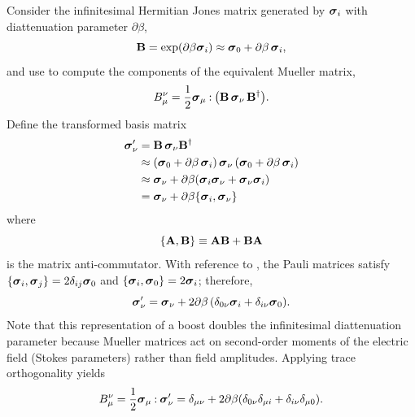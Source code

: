 Consider the infinitesimal Hermitian Jones matrix generated by $\mbox{\boldmath $\sigma$}_{i}$ with 
diattenuation parameter $\partial\beta$,
\begin{equation}
\label{eqn:small_boost_basis_Jones}
{\bf B} = \exp(\partial\beta\mbox{\boldmath $\sigma$}_{i}) \approx \mbox{\boldmath $\sigma$}_{0} + \partial\beta \, \mbox{\boldmath $\sigma$}_{i},
\end{equation} 
and use  to compute the components of the equivalent Mueller matrix,
\begin{equation}
  B_\mu^\nu = \frac{1}{2} {\mbox{\boldmath $\sigma$}_{\mu}}\mathbin{:}{\left({\bf B} \, \mbox{\boldmath $\sigma$}_{\nu}\,{\bf B}^\dagger\right)}.
\end{equation}
%
Define the transformed basis matrix
\begin{equation}
\begin{split}
\mbox{\boldmath $\sigma$}_{\nu}' & = {\bf B} \, \mbox{\boldmath $\sigma$}_{\nu} {\bf B} ^\dagger \\
  & \approx \left( \mbox{\boldmath $\sigma$}_{0} + \partial\beta \, \mbox{\boldmath $\sigma$}_{i} \right) \mbox{\boldmath $\sigma$}_{\nu} \left( \mbox{\boldmath $\sigma$}_{0} + \partial\beta \, \mbox{\boldmath $\sigma$}_{i} \right) \\
  & \approx \mbox{\boldmath $\sigma$}_{\nu} + \partial\beta (\mbox{\boldmath $\sigma$}_{i} \mbox{\boldmath $\sigma$}_{\nu} + \mbox{\boldmath $\sigma$}_{\nu} \mbox{\boldmath $\sigma$}_{i}) \\
  & = \mbox{\boldmath $\sigma$}_{\nu} + \partial\beta \{\mbox{\boldmath $\sigma$}_{i}, \mbox{\boldmath $\sigma$}_{\nu}\}
\end{split}
\end{equation}
%
where 
\begin{equation} \label{eqn:anticommutator}
    \{{\bf A}, {\bf B}\} \equiv {\bf AB} + {\bf BA}
\end{equation} 
is the matrix anti-commutator.
%
With reference to , the Pauli matrices satisfy 
$\{\mbox{\boldmath $\sigma$}_{i}, \mbox{\boldmath $\sigma$}_{j}\} = 2\delta_{ij}\mbox{\boldmath $\sigma$}_{0}$ and 
$\{\mbox{\boldmath $\sigma$}_{i}, \mbox{\boldmath $\sigma$}_{0}\} = 2\mbox{\boldmath $\sigma$}_{i}$; 
therefore,
%
\begin{equation}
    \mbox{\boldmath $\sigma$}_{\nu}' = \mbox{\boldmath $\sigma$}_{\nu} + 2 \partial\beta \, ( \delta_{0\nu} \mbox{\boldmath $\sigma$}_{i} + \delta_{i\nu} \mbox{\boldmath $\sigma$}_{0} ).
\end{equation}
%
Note that this representation of a boost doubles the infinitesimal diattenuation parameter 
because Mueller matrices act on second-order moments of the electric field (Stokes parameters) 
rather than field amplitudes.
%
Applying trace orthogonality  yields
%
\begin{equation}
B_\mu^\nu = \frac{1}{2} {\mbox{\boldmath $\sigma$}_{\mu}}\mathbin{:}{\mbox{\boldmath $\sigma$}_{\nu}'}
  = \delta_{\mu\nu} + 2 \partial\beta ( \delta_{0\nu}\delta_{\mu i} + \delta_{i\nu} \delta_{\mu 0} ).
\end{equation}
